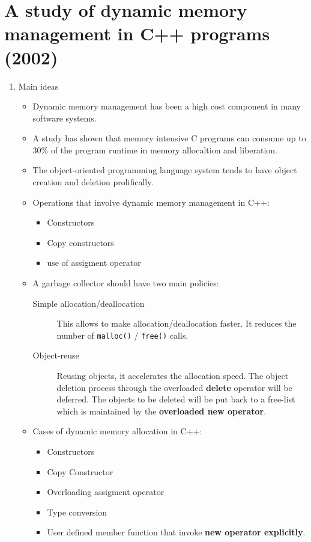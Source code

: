 \documentclass[openany, a4paper]{book}
\theoremstyle{break}
\theoremstyle{example}
\theoremstyle{note}
\theoremstyle{break}
\theoremstyle{exercise}
\begin{document}
\section{A study of dynamic memory management in C++ programs (2002)}
\label{sec:org3ad4c75}
\begin{enumerate}
\item Main ideas
\label{sec:org355f7ff}

\begin{itemize}
\item Dynamic memory management has been a high cost component in many software
systems.
\item A study has shown that memory intensive C programs can consume up to 30\%
of the program runtime in memory allocaltion and liberation.
\item The object-oriented programming language system tends to have object
creation and deletion prolifically.
\item Operations that involve dynamic memory management in C++:
\begin{itemize}
\item Constructors
\item Copy constructors
\item use of assigment operator
\end{itemize}
\item A garbage collector should have two main policies:
\begin{description}
\item[{Simple allocation/deallocation}] This allows to make
allocation/deallocation faster. It reduces the number of \texttt{malloc()} /
\texttt{free()} calls.
\item[{Object-reuse}] Reusing objects, it accelerates the allocation
speed. The object deletion process through the overloaded \textbf{delete}
operator will be deferred. The objects to be deleted will be put back
to a free-list which is maintained by the \textbf{overloaded new operator}.
\end{description}
\item Cases of dynamic memory allocation in C++:
\begin{itemize}
\item Constructors
\item Copy Constructor
\item Overloading assigment operator
\item Type conversion
\item User defined member function that invoke \textbf{new operator explicitly}.
\end{itemize}
\end{itemize}


\end{enumerate}
\end{document}
